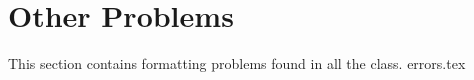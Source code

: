 \section{Other Problems} %
\label{sec:other_problems}
This section contains formatting problems found in all the class.
{errors.tex}



